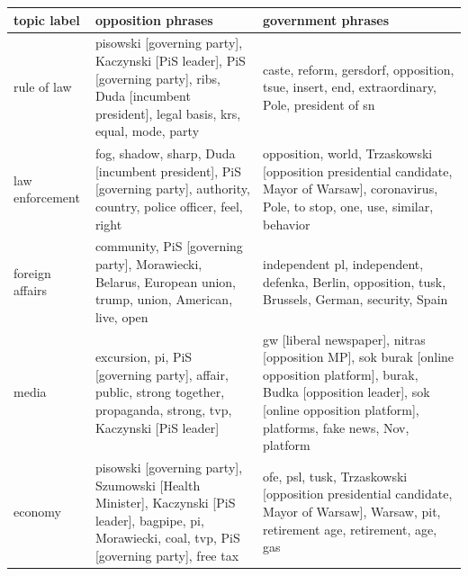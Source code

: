 \documentclass{article}
\begin{document}
	\begin{longtable}{p{2cm}p{6cm}p{6cm}}
		\toprule
		topic label &                                                                                                                                                                opposition phrases &                                                                                                                                                                               government phrases \\
		\midrule
		rule of law &                                 pisowski [governing party], Kaczynski [PiS leader], PiS [governing party], ribs, Duda [incumbent president], legal basis, krs, equal, mode, party &                                                                                                     caste, reform, gersdorf, opposition, tsue, insert, end, extraordinary, Pole, president of sn \\
		law enforcement &                                                            fog, shadow, sharp, Duda [incumbent president], PiS [governing party], authority, country, police officer, feel, right &                                                     opposition, world, Trzaskowski [opposition presidential candidate, Mayor of Warsaw], coronavirus, Pole, to stop, one, use, similar, behavior \\
		foreign affairs &                                                                         community, PiS [governing party], Morawiecki, Belarus, European union, trump, union, American, live, open &                                                                                                independent pl, independent, defenka, Berlin, opposition, tusk, Brussels, German, security, Spain \\
		media &                                                            excursion, pi, PiS [governing party], affair, public, strong together, propaganda, strong, tvp, Kaczynski [PiS leader] &  gw [liberal newspaper], nitras [opposition MP], sok burak [online opposition platform], burak, Budka [opposition leader], sok [online opposition platform], platforms, fake news, Nov, platform \\
		economy &                              pisowski [governing party], Szumowski [Health Minister], Kaczynski [PiS leader], bagpipe, pi, Morawiecki, coal, tvp, PiS [governing party], free tax &                                                              ofe, psl, tusk, Trzaskowski [opposition presidential candidate, Mayor of Warsaw], Warsaw, pit, retirement age, retirement, age, gas \\

\end{longtable}
\end{document}
